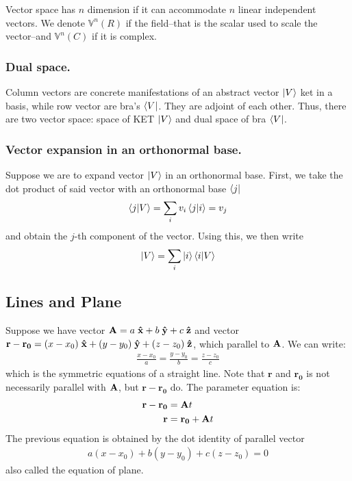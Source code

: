 \documentclass[../main.tex]{subfiles}
\begin{document}
Vector space has $n$ dimension if it can accommodate $n$ linear independent vectors.
We denote $\mathbb{V}^n(R)$ if the field--that is the scalar used to scale the vector--and $\mathbb{V}^n(C)$ if it is complex.

\subsubsection{Dual space.}
Column vectors are concrete manifestations of an abstract vector $\ket{V}$ ket in a basis, while row vector are bra's $\bra{V}$.
They are adjoint of each other.
Thus, there are two vector space: space of KET $\ket{V}$ and dual space of bra $\bra{V}$.

\subsubsection{Vector expansion in an orthonormal base.}
Suppose we are to expand vector $\ket{V}$ in an  orthonormal base.
First, we take the dot product of said vector with an orthonormal base $\bra{j}$
\begin{equation*}
	\braket{j|V}=\sum_i v_i\braket{j|i}=v_j
\end{equation*}
and obtain the $j$-th component of the vector.
Using this, we then write
\begin{equation*}
	\ket{V}=\sum_i \ket{i}\braket{i|V}
\end{equation*}

\subsection{Lines and Plane}
Suppose we have vector $\mathbf{A}=a\;\mathbf{\hat{x}}+b\;\mathbf{\hat{y}} +c\;\mathbf{\hat{z}}$ and vector $\mathbf{r}-\mathbf{r_0}=(x-x_0)\;\mathbf{\hat{x}}+(y-y_0)\;\mathbf{\hat{y}} +(z-z_0)\;\mathbf{\hat{z}}$, which parallel to $\mathbf{A}$.
We can write:
\begin{align*}
	\frac{x-x_0}{a}=\frac{y-y_0}{b}=\frac{z-z_0}{c}
\end{align*}
which is the symmetric equations of a straight line.
Note that $\mathbf{r}$ and $\mathbf{r_0}$ is not necessarily parallel with $\mathbf{A}$, but $\mathbf{r}-\mathbf{r_0}$ do.
The parameter equation is:
\begin{align*}
	\mathbf{r}-\mathbf{r_0} & =\mathbf{A} t              \\
	\mathbf{r}              & =\mathbf{r_0}+\mathbf{A} t
\end{align*}
The previous equation is obtained by the dot identity of parallel vector
\begin{align*}
	a(x-x_0)+b(y-y_0)+c(z-z_0)=0
\end{align*}
also called the equation of plane.
\end{document}
